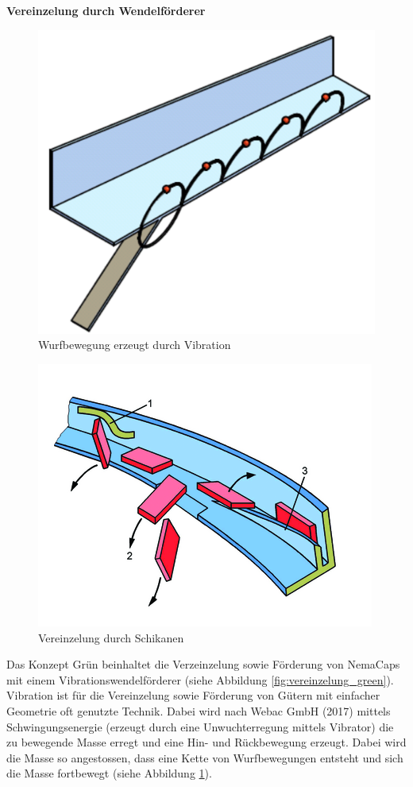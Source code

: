 \textbf{Vereinzelung durch Wendelförderer}
\begin{figure}
	\includegraphics[scale=0.2]{Illustrationen/5-Konzept/foerderbewegung.png}
	\caption{Wurfbewegung erzeugt durch Vibration}
	\label{fig:foerderbewegung}
\end{figure}
\begin{figure}
	\includegraphics[scale=2.0]{Illustrationen/5-Konzept/schikane.png}
	\caption{Vereinzelung durch Schikanen}
	\label{fig:schikane}
\end{figure}
Das Konzept Grün beinhaltet die Verzeinzelung sowie Förderung von NemaCaps mit einem Vibrationswendelförderer (siehe Abbildung \ref{fig:vereinzelung_green}). Vibration ist für die Vereinzelung sowie Förderung von Gütern mit einfacher Geometrie oft genutzte Technik. Dabei wird nach Webac GmbH (2017) mittels Schwingungsenergie (erzeugt durch eine Unwuchterregung mittels Vibrator) die zu bewegende Masse erregt und eine Hin- und Rückbewegung erzeugt. Dabei wird die Masse so angestossen, dass eine Kette von Wurfbewegungen entsteht und sich die Masse fortbewegt (siehe Abbildung \ref{fig:foerderbewegung}).
\newline

